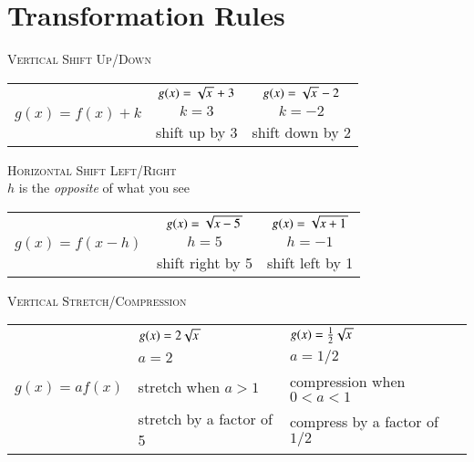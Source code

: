 \section{Transformation Rules}

\begin{center}
    {\Large\scshape Vertical Shift Up/Down}\\[0.5em]
    \renewcommand{\arraystretch}{1.5}
    \begin{tabular}{ r | c | c }
        \toprule
        \multirow{3}{*}{\Large   $g(x) = f(x) + k$   } 
            & {\large $g(x) = \myRoot{x} + 3$ }
            & {\large $g(x) = \myRoot{x} - 2$ }\\ \cline{2-3}
            & $k=3$ 
            & $k=-2$ \\ \cline{2-3}
            & shift up by 3 
            & shift down by 2 \\ 
        \bottomrule
    \end{tabular}
\end{center}

\begin{center}
    {\Large\scshape Horizontal Shift Left/Right} \\
    {\small $h$ is the {\itshape opposite} of what you see}\\[0.5em]
    \renewcommand{\arraystretch}{1.5}
    \begin{tabular}{ r | c | c }
        \toprule
        \multirow{3}{*}{\Large   $g(x) = f(x-h) $   } 
            & {\large $g(x) = \myRoot{x-5} $ } 
            & {\large $g(x) = \myRoot{x+1} $ } \\ \cline{2-3}
            & $h=5$ 
            & $h=-1$ \\ \cline{2-3}
            & shift right by 5 
            & shift left by 1 \\ 
        \bottomrule
    \end{tabular}
\end{center}

\begin{center}
    {\Large\scshape Vertical Stretch/Compression}\nopagebreak\\[0.5em]
    \renewcommand{\arraystretch}{1.5}
    \begin{tabular}{ r | l | l }
        \toprule
        \multirow{4}{*}{   \Large $g(x) = a f(x) $   } 
            & {\large $g(x) = 2 \myRoot{x} $ }
            & {\large $g(x) = \frac{1}{2} \myRoot{x} $} \\ \cline{2-3}
            & $a=2$ 
            & $a=1/2$ \\ 
            & {\small stretch when $a>1$}
            & {\small compression when $0<a<1$} \\ \cline{2-3}
            & stretch by a factor of 5 
            & compress by a factor of $1/2$ \\ 
        \bottomrule
    \end{tabular}
\end{center}


